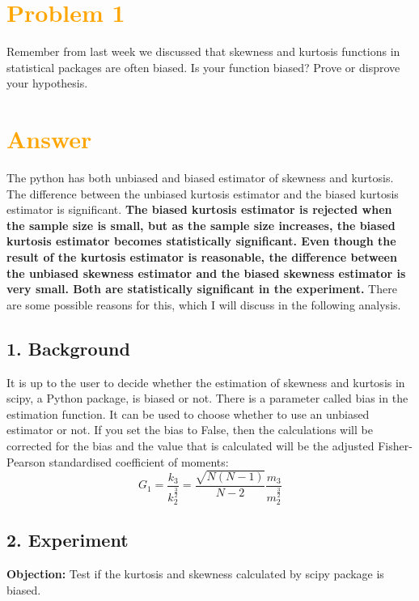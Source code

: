 \documentclass[11pt,en]{elegantpaper}
\begin{document}
\section*{\textcolor{orange}{Problem 1}}
Remember from last week we discussed that skewness and kurtosis functions in statistical packages 
are often biased. Is your function biased? Prove or disprove your hypothesis.

\section*{\textcolor{orange}{Answer}}
The python has both unbiased and biased estimator of skewness and kurtosis. The difference between the unbiased kurtosis estimator and the biased kurtosis estimator 
is significant. \textbf{The biased kurtosis estimator is rejected when the sample size is small, 
but as the sample size increases, the biased kurtosis estimator becomes statistically 
significant. Even though the result of the kurtosis estimator is reasonable, the difference 
between the unbiased skewness estimator and the biased skewness estimator is very small. 
Both are statistically significant in the experiment.} There are some possible reasons for this, 
which I will discuss in the following analysis.

\subsection*{1. Background}
It is up to the user to decide whether the estimation of skewness and kurtosis in scipy, a Python package, 
is biased or not. There is a parameter called bias in the estimation function. It can be used to choose 
whether to use an unbiased estimator or not. If you set the bias to False, then the calculations will be 
corrected for the bias and the value that is calculated will be the adjusted Fisher-Pearson standardised 
coefficient of moments:
\[
    G_1=\frac{k_3}{k_2^{\frac{3}{2}}}=\frac{\sqrt{N(N-1)}}{N-2}\frac{m_3}{m_2^{\frac{3}{2}}}
\]

\subsection*{2. Experiment}
\textbf{Objection:} Test if the kurtosis and skewness calculated by scipy package is biased.
\end{document}
